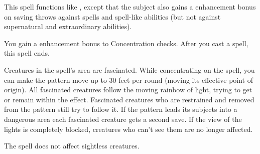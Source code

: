\begin{spelleffect}
  This spell functions like , except that the subject also gains a  enhancement bonus on saving throws against spells and spell-like abilities (but not against supernatural and extraordinary abilities).
\end{spelleffect}

\begin{spelleffect}
  You gain a  enhancement bonus to Concentration checks. After you cast a spell, this spell ends.
\end{spelleffect}

\begin{comment}
\subsubsection{Q-R}
\end{comment}

\spellrng{\rngmed}
\begin{spelleffect}
  Creatures in the spell's area are fascinated. While concentrating on the spell, you can make the pattern move up to 30 feet per round (moving its effective point of origin). All fascinated creatures follow the moving rainbow of light, trying to get or remain within the effect. Fascinated creatures who are restrained and removed from the pattern still try to follow it. If the pattern leads its subjects into a dangerous area each fascinated creature gets a second save. If the view of the lights is completely blocked, creatures who can't see them are no longer affected.
\end{spelleffect}
\begin{spellnotes}
  The spell does not affect sightless creatures.
\end{spellnotes}

